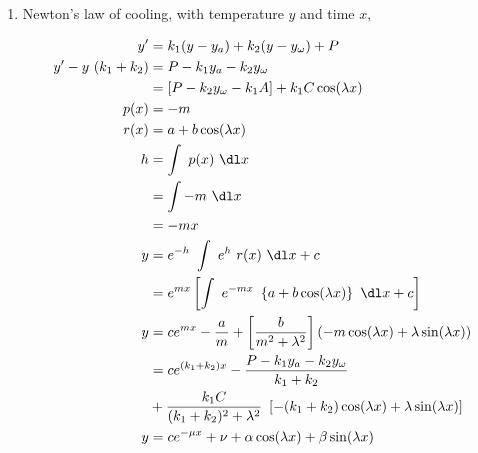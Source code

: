 \begin{enumerate}
    \item Newton's law of cooling, with temperature $ y $ and time $ x $,

          \begin{align}
              y'                      & = k_{1}(y - y_{a}) + k_{2}(y - y_{\omega}) + P                                                                                    \\
              y' - y\ (k_{1} + k_{2}) & = P - k_{1}y_{a} - k_{2}y_{\omega}                                                                                                \\
                                      & = [ P - k_{2}y_{\omega} -k_{1}A ] + k_{1}C \cos(\lambda x)                                                                        \\
              p(x)                    & = -m                                                                                                                              \\
              r(x)                    & = a + b\cos(\lambda x)                                                                                                            \\
              h                       & = \int\ p(x)\ \dl x                                                                                                               \\
                                      & = \int -m\ \dl x                                                                                                                  \\
                                      & = -mx                                                                                                                             \\
              y                       & = e^{-h}\ \int\ e^{h}\ r(x)\ \dl x + c                                                                                            \\
                                      & = e^{mx} \left[ \int\ e^{-mx}\ \left\{ a + b\cos (\lambda x)  \right\}\ \dl x + c \right]                                         \\
              y                       & =  ce^{mx} -\frac{a}{m} + \left[ \frac{b}{m^{2}+\lambda^{2}} \right] \left( -m \cos (\lambda x) + \lambda \sin (\lambda x)\right) \\
                                      & = ce^{(k_{1} + k_{2})x} - \frac{P - k_{1}y_{a} - k_{2}y_{\omega}}{k_{1} + k_{2}}                                                  \\
                                      & + \frac{k_{1}C}{(k_{1} + k_{2})^{2} + \lambda^{2}}\ \left[ -(k_{1} + k_{2})\cos (\lambda x) + \lambda \sin (\lambda x) \right]    \\
              y                       & = ce^{-\mu x} + \nu + \alpha \cos (\lambda x) + \beta \sin(\lambda x)
          \end{align}


\end{enumerate}
